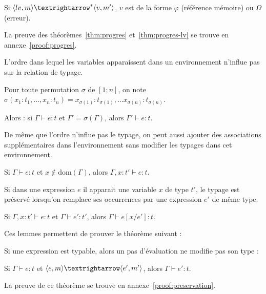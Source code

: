 \begin{theorem}
  \label{thm:progres-lv}

  Si $\mmstar{m}{lv}{m'}{v}$, $v$ est de la forme $φ$ (référence mémoire) ou $Ω$
  (erreur).

\end{theorem}


La preuve des
théorèmes~\ref{thm:progres}
et~\ref{thm:progres-lv}
se trouve en annexe~\ref{proof:progres}.

\begin{lemma}[Permutation]
  L'ordre dans lequel les variables apparaissent dans un environnement
  n'influe pas sur la relation de typage.

  Pour toute permutation $σ$ de $[1;n]$, on note $σ(x_1 : t_1, …, x_n : t_n) =
  x_{σ(1)} : t_{σ(1)}, … x_{σ(n)} : t_{σ(n)}$.

  Alors : si $Γ ⊢ e : t$ et $Γ' = σ(Γ)$, alors $Γ' ⊢ e : t$.
\end{lemma}

\begin{lemma}[Affaiblissement]
  De même que l'ordre n'influe pas le typage, on peut aussi ajouter des
  associations supplémentaires dans l'environnement sans modifier les typages
  dans cet environnement.

  Si $Γ ⊢ e : t$ et $x ∉ \mathrm{dom}(Γ)$, alors $Γ, x : t' ⊢ e : t$.
\end{lemma}

\begin{lemma}[Substitution]
  Si dans une expression $e$ il apparait une variable $x$ de type $t'$, le
  typage est préservé lorsqu'on remplace ses occurrences par une expression $e'$
  de même type.

  Si $Γ, x : t' ⊢ e : t$ et $Γ ⊢ e' : t'$, alors $Γ ⊢ e [x/e'] : t$.
\end{lemma}

Ces lemmes permettent de prouver le théorème suivant :

\begin{theorem}[Préservation]
  \label{thm:preservation}

  Si une expression est typable, alors un pas d'évaluation ne modifie pas son
  type :

  Si $Γ ⊢ e : t$ et $\mm{m}{e}{m'}{e'}$, alors $Γ ⊢ e' : t$.

\end{theorem}

La preuve de ce théorème se trouve en annexe~\ref{proof:preservation}.

